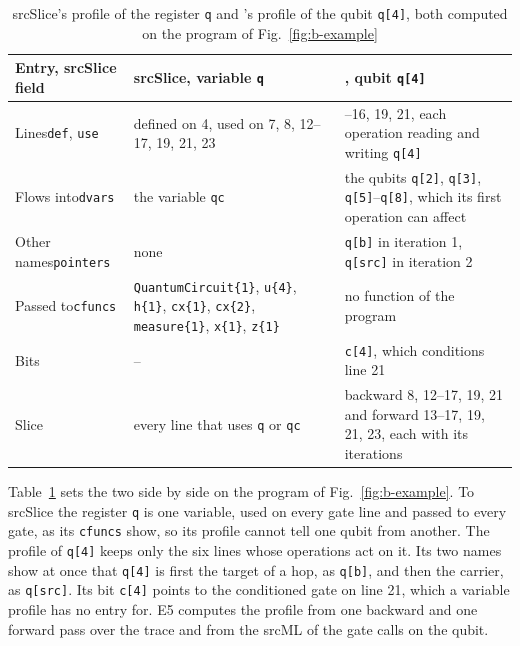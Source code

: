 \begin{table}[t]
  \centering
  \caption{srcSlice's profile of the register \texttt{q} and \tool{}'s profile of the qubit \texttt{q[4]}, both computed
  on the program of Fig.~\ref{fig:b-example}}
  \label{tab:b-profile}
  \footnotesize\setlength{\tabcolsep}{3pt}\renewcommand{\arraystretch}{1.12}
  \newcommand{\sep}{\arrayrulecolor{black!25}\hline\arrayrulecolor{black}}
  \begin{tabular}{@{}>{\raggedright\arraybackslash}p{1.55cm} >{\raggedright\arraybackslash}p{2.75cm} >{\raggedright\arraybackslash}p{3.85cm}@{}}
    \toprule
    \rowcolor{black!8}\textbf{Entry, srcSlice field} & \textbf{srcSlice, variable \texttt{q}} & \textbf{\tool{}, qubit \texttt{q[4]}} \\
    \midrule
    Lines\newline\texttt{def}, \texttt{use} & defined on 4, used on 7, 8, 12--17, 19, 21, 23 & 13--16, 19, 21, each operation reading and writing \texttt{q[4]} \\ \sep
    Flows into\newline\texttt{dvars} & the variable \texttt{qc} & the qubits \texttt{q[2]}, \texttt{q[3]}, \texttt{q[5]}--\texttt{q[8]}, which its first operation can affect \\ \sep
    Other names\newline\texttt{pointers} & none & \texttt{q[b]} in iteration 1, \texttt{q[src]} in iteration 2 \\ \sep
    Passed to\newline\texttt{cfuncs} & \texttt{Quantum}\allowbreak\texttt{Circuit\{1\}}, \texttt{u\{4\}}, \texttt{h\{1\}}, \texttt{cx\{1\}}, \texttt{cx\{2\}}, \texttt{measure\{1\}}, \texttt{x\{1\}}, \texttt{z\{1\}} & no function of the program \\ \sep
    Bits & -- & \texttt{c[4]}, which conditions line 21 \\ \sep
    Slice & every line that uses \texttt{q} or \texttt{qc} & backward 8, 12--17, 19, 21 and forward 13--17, 19, 21, 23, each with its iterations \\
    \bottomrule
  \end{tabular}
\end{table}

Table~\ref{tab:b-profile} sets the two side by side on the program of Fig.~\ref{fig:b-example}. To srcSlice the register
\texttt{q} is one variable, used on every gate line and passed to every gate, as its \texttt{cfuncs} show, so its profile cannot tell one qubit from
another. The profile of \texttt{q[4]} keeps only the six lines whose operations act on it. Its two names show at once
that \texttt{q[4]} is first the target of a hop, as \texttt{q[b]}, and then the carrier, as \texttt{q[src]}. Its bit
\texttt{c[4]} points to the conditioned gate on line 21, which a variable profile has no entry for. E5 computes the
profile from one backward and one forward pass over the trace and from the srcML of the gate calls on the qubit.

